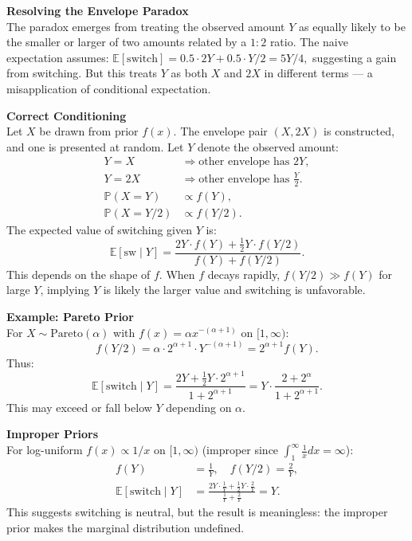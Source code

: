 \begin{technical}
{\Large\textbf{Resolving the Envelope Paradox}}\\[0.3em]

The paradox emerges from treating the observed amount $Y$ as equally likely to be the smaller or larger of two amounts related by a $1:2$ ratio. The naive expectation assumes: $
\mathbb{E}[\text{switch}] = 0.5 \cdot 2Y + 0.5 \cdot Y/2 = 5Y/4,$ suggesting a gain from switching. But this treats $Y$ as both $X$ and $2X$ in different terms — a misapplication of conditional expectation.

\textbf{Correct Conditioning}\\[0.2em]
Let $X$ be drawn from prior $f(x)$. The envelope pair $(X, 2X)$ is constructed, and one is presented at random. Let $Y$ denote the observed amount:
\begin{align}
Y = X &\Rightarrow \text{other envelope has } 2Y,\\
Y = 2X &\Rightarrow \text{other envelope has } \frac{Y}{2}.\\[0.3em]
\mathbb{P}(X = Y) &\propto f(Y), \\
\mathbb{P}(X = Y/2) &\propto f(Y/2).
\end{align}
The expected value of switching given $Y$ is:
\[
\mathbb{E}[\text{sw} \mid Y] 
= \frac{2Y \cdot f(Y) + \tfrac{1}{2}Y \cdot f(Y/2)}{f(Y) + f(Y/2)}.
\]
This depends on the shape of $f$. When $f$ decays rapidly, $f(Y/2) \gg f(Y)$ for large $Y$, implying $Y$ is likely the larger value and switching is unfavorable.

\textbf{Example: Pareto Prior}\\[0.2em]
For $X \sim \text{Pareto}(\alpha)$ with $f(x) = \alpha x^{-(\alpha + 1)}$ on $[1, \infty)$:
\[
f(Y/2) = \alpha \cdot 2^{\alpha + 1} \cdot Y^{-(\alpha + 1)} = 2^{\alpha + 1} f(Y).
\]
Thus:
\[
\mathbb{E}[\text{switch} \mid Y] = \frac{2Y + \tfrac{1}{2}Y \cdot 2^{\alpha + 1}}{1 + 2^{\alpha + 1}} = Y \cdot \frac{2 + 2^{\alpha}}{1 + 2^{\alpha + 1}}.
\]
This may exceed or fall below $Y$ depending on $\alpha$.

\textbf{Improper Priors}\\[0.2em]
For log-uniform $f(x) \propto 1/x$ on $[1, \infty)$ (improper since $\int_1^{\infty} \frac{1}{x} dx = \infty$):
\begin{align}
f(Y) &= \frac{1}{Y}, \quad f(Y/2) = \frac{2}{Y},\\
\mathbb{E}[\text{switch} \mid Y] &= \frac{2Y \cdot \frac{1}{Y} + \tfrac{1}{2}Y \cdot \frac{2}{Y}}{\frac{1}{Y} + \frac{2}{Y}} = Y.
\end{align}
This suggests switching is neutral, but the result is meaningless: the improper prior makes the marginal distribution undefined. 


\end{technical}
